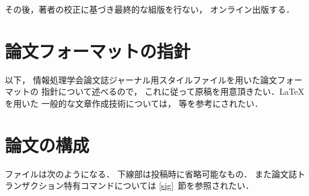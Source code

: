 \documentclass[submit]{ipsj}
\begin{document}
その後，著者の校正に基づき最終的な組版を行ない，
オンライン出版する．

\section{論文フォーマットの指針}
\label{sec:format}

以下，
情報処理学会論文誌ジャーナル用スタイルファイルを用いた論文フォーマットの
指針について述べるので，
これに従って原稿を用意頂きたい．\LaTeX を用いた
一般的な文章作成技術については，\cite{okumura, companion} 等を参考にされたい．

\section{論文の構成}
\label{config}

ファイルは次のようになる．
下線部は投稿時に省略可能なもの．
また論文誌トランザクション特有コマンドについては \ref{sig}~節を参照されたい．
\end{document}
